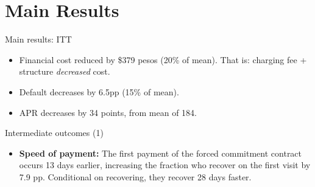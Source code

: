 \documentclass[8pt]{beamer}
\begin{document}
\section{Main Results}

\begin{frame}{Main results: ITT}
\label{main_results}


\begin{itemize}
    \item Financial cost reduced by \$379 pesos (20\% of mean). That is: charging fee + structure \textit{decreased} cost.
    \item Default decreases by 6.5pp (15\% of mean).
    \item APR decreases by 34 points, from mean of 184.
\end{itemize}
\vspace{.3in}
\begin{table}[H]
\begin{center}
\resizebox{0.95\textwidth}{!}{
\small{}
}
\end{center}
\end{table}

   \vfill 

\end{frame}








\begin{frame}{Intermediate outcomes (1)}
\label{mechanism_appendix}

\begin{table}[H]
\caption{Intermediate outcomes}
\begin{center}
\scriptsize{}
\end{center}
\end{table}
\vfill
 \begin{itemize}
     \item \textbf{Speed of payment:} The first payment of the forced commitment contract  occurs 13 days earlier, increasing the fraction who recover on the first visit by 7.9 pp. Conditional on recovering, they recover 28 days faster.
\end{itemize}
\end{frame}
\end{document}
